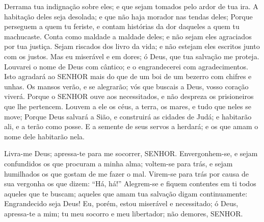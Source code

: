 {  Derrama tua indignação sobre eles; e que sejam tomados pelo ardor de tua ira.
  A habitação deles seja desolada; e que não haja morador nas tendas deles;
  Porque perseguem
{} a quem tu feriste, e contam histórias da dor daqueles a quem tu machucaste.
  Conta como maldade a maldade deles; e não sejam eles agraciados por tua justiça.
  Sejam riscados dos livro da vida; e não estejam eles escritos junto com os justos.
  Mas eu
{} miserável e em dores; ó Deus, que tua salvação me proteja.
  Louvarei o nome de Deus com cântico; e o engrandecerei com agradecimentos.
  Isto agradará ao SENHOR mais do que
{} de um boi
{} de um bezerro com chifres e unhas.
  Os mansos verão, e se alegrarão; vós que buscais a Deus, vosso coração viverá.
  Porque o SENHOR ouve aos necessitados, e não despreza os prisioneiros que lhe pertencem.
  Louvem a ele os céus, a terra, os mares, e tudo que neles se move;
  Porque Deus salvará a Sião, e construirá as cidades de Judá; e habitarão ali, e a terão como posse.
  E a semente de seus servos a herdará; e os que amam o nome dele habitarão nela.
\par }


{\PP 
  Livra-me Deus; apressa-te para me socorrer, SENHOR.
  Envergonhem-se, e sejam confundidos os que procuram
{} a minha alma; voltem-se para trás, e sejam humilhados os que gostam de me fazer o mal.
  Virem-se para trás por causa de sua vergonha os que dizem: “Há, há!”
  Alegrem-se e fiquem contentes em ti todos aqueles que te buscam; aqueles que amam tua salvação digam continuamente: Engrandecido seja Deus!
  Eu, porém, estou miserável e necessitado; ó Deus, apressa-te a mim; tu
{} meu socorro e meu libertador; não demores, SENHOR.
\par }

